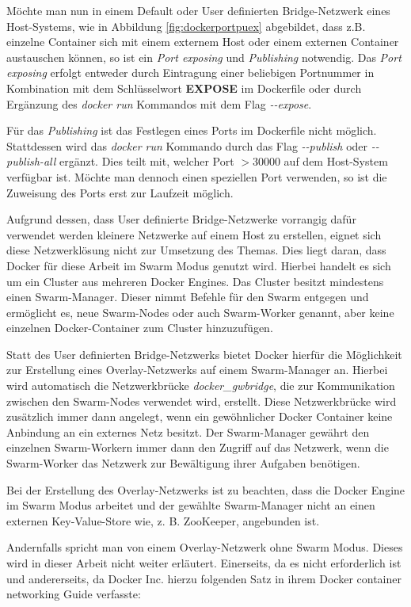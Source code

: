 Möchte man nun in einem Default oder User definierten Bridge-Netzwerk eines Host-Systems, wie in Abbildung \ref{fig:dockerportpuex} abgebildet, dass z.B. einzelne Container sich mit einem externem Host oder einem externen Container austauschen können, so ist ein \textit{Port exposing} und \textit{Publishing} notwendig.
Das \textit{Port exposing} erfolgt entweder durch Eintragung einer beliebigen Portnummer in Kombination mit dem Schlüsselwort \textbf{EXPOSE} im Dockerfile oder durch Ergänzung des \textit{docker run} Kommandos mit dem Flag \textit{{-}{-}expose}.

Für das \textit{Publishing} ist das Festlegen eines Ports im Dockerfile nicht möglich.
Stattdessen wird das \textit{docker run} Kommando durch das Flag \textit{{-}{-}publish} oder \textit{{-}{-}publish-all} ergänzt.
Dies teilt mit, welcher Port $>30000$ auf dem Host-System verfügbar ist.
Möchte man dennoch einen speziellen Port verwenden, so ist die Zuweisung des Ports erst zur Laufzeit möglich.

Aufgrund dessen, dass User definierte Bridge-Netzwerke vorrangig dafür verwendet werden kleinere Netzwerke auf einem Host zu erstellen, eignet sich diese Netzwerklösung nicht zur Umsetzung des Themas.
Dies liegt daran, dass Docker für diese Arbeit im Swarm Modus genutzt wird.
Hierbei handelt es sich um ein Cluster aus mehreren Docker Engines.
Das Cluster besitzt mindestens einen Swarm-Manager.
Dieser nimmt Befehle für den Swarm entgegen und ermöglicht es, neue Swarm-Nodes oder auch Swarm-Worker genannt, aber keine einzelnen Docker-Container zum Cluster hinzuzufügen.

Statt des User definierten Bridge-Netzwerks bietet Docker hierfür die Möglichkeit zur Erstellung eines Overlay-Netzwerks auf einem Swarm-Manager an.
Hierbei wird automatisch die Netzwerkbrücke \textit{docker\_gwbridge}, die zur Kommunikation zwischen den Swarm-Nodes verwendet wird, erstellt.
Diese Netzwerkbrücke wird zusätzlich immer dann angelegt, wenn ein gewöhnlicher Docker Container keine Anbindung an ein externes Netz besitzt.
Der Swarm-Manager gewährt den einzelnen Swarm-Workern immer dann den Zugriff auf das Netzwerk, wenn die Swarm-Worker das Netzwerk zur Bewältigung ihrer Aufgaben benötigen. 

Bei der Erstellung des Overlay-Netzwerks ist zu beachten, dass die Docker Engine im Swarm Modus arbeitet und der gewählte Swarm-Manager nicht an einen externen Key-Value-Store wie, z. B. ZooKeeper, angebunden ist.

Andernfalls spricht man von einem Overlay-Netzwerk ohne Swarm Modus.
Dieses wird in dieser Arbeit nicht weiter erläutert.
Einerseits, da es nicht erforderlich ist und andererseits, da Docker Inc. hierzu folgenden Satz in ihrem \glqq{}Docker container networking Guide\grqq{} verfasste:

